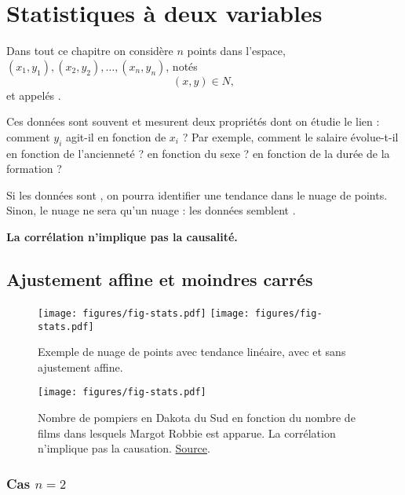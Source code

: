 
\chapter{Statistiques à deux variables}

Dans tout ce chapitre on considère $n$ points dans l'espace, $(x_1, y_1), (x_2, y_2), \dots, (x_n, y_n)$, notés
	\[ (x, y) \in N, \]
et appelés .

Ces données sont souvent  et mesurent deux propriétés dont on étudie le lien : comment $y_i$ agit-il en fonction de $x_i$ ?
Par exemple, comment le salaire évolue-t-il en fonction de l'ancienneté ? en fonction du sexe ? en fonction de la durée de la formation ?

Si les données sont , on pourra identifier une tendance dans le nuage de points.
Sinon, le nuage ne sera qu'un nuage : les données semblent .

\textbf{\warning La corrélation n'implique pas la causalité.}

\section{Ajustement affine et moindres carrés}

\begin{figure}
	\centering
	\texttt{[image: figures/fig-stats.pdf]}
	\texttt{[image: figures/fig-stats.pdf]}
	\caption{Exemple de nuage de points avec tendance linéaire, avec et sans ajustement affine.}
	\label{fig:stats-1}
\end{figure}



\begin{figure}
	\centering
	\texttt{[image: figures/fig-stats.pdf]}
	\caption{Nombre de pompiers en Dakota du Sud en fonction du nombre de films dans lesquels Margot Robbie est apparue. La corrélation n'implique pas la causation. \href{https://www.tylervigen.com/spurious/correlation/5846_the-number-of-movies-margot-robbie-appeared-in_correlates-with_the-number-of-firefighters-in-south-dakota}{Source}.}
\end{figure}


\subsection{Cas $n=2$}

